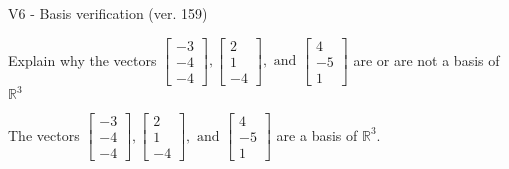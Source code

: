 \begin{exercise}
  \begin{exerciseTitle}V6 - Basis verification (ver. 159)\end{exerciseTitle}
  \begin{exerciseStatement}
    Explain why the vectors \(\left[\begin{array}{r}
-3 \\
-4 \\
-4
\end{array}\right] , \left[\begin{array}{r}
2 \\
1 \\
-4
\end{array}\right] , \text{ and } \left[\begin{array}{r}
4 \\
-5 \\
1
\end{array}\right]\) are or are not a basis of \(\mathbb{R}^3\)	


  \end{exerciseStatement}
  \begin{exerciseAnswer}
   The vectors \(\left[\begin{array}{r}
-3 \\
-4 \\
-4
\end{array}\right] , \left[\begin{array}{r}
2 \\
1 \\
-4
\end{array}\right] , \text{ and } \left[\begin{array}{r}
4 \\
-5 \\
1
\end{array}\right]\) 
  	 are  a basis of \(\mathbb{R}^3\).
  


  \end{exerciseAnswer}
\end{exercise}